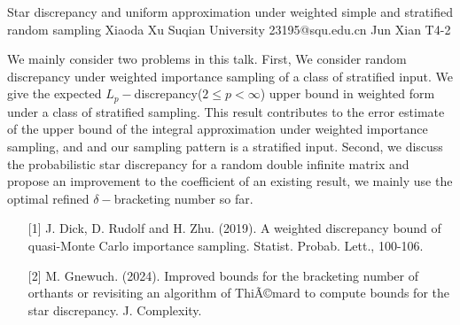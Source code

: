 \begin{talk}
  {Star discrepancy and uniform approximation under weighted simple and stratified random sampling}%
  {Xiaoda Xu}%
  {Suqian University}%
  {23195@squ.edu.cn}%
  {Jun Xian}%
  {T4-2}%
			
We mainly consider two problems in this talk. First, We consider random discrepancy under weighted importance sampling of a class of stratified input. We give the expected $L_p-$discrepancy($2\leq p<\infty$) upper bound in weighted form under a class of stratified sampling. This result contributes to the error estimate of the upper bound of the integral approximation under weighted importance sampling, and and our sampling pattern is a stratified input. Second, we discuss the probabilistic star discrepancy for a random double infinite matrix and propose an improvement to the coefficient of an existing result, we mainly use the optimal refined $\delta-$bracketing number so far.
\medskip


\begin{enumerate}
	\item[{[1]}] J. Dick, D. Rudolf and H. Zhu. (2019). A weighted discrepancy bound of quasi-Monte Carlo importance sampling. Statist. Probab. Lett., 100-106.
	\item[{[2]}] M. Gnewuch. (2024). Improved bounds for the bracketing number of orthants or revisiting an algorithm of ThiÃ©mard to compute bounds for the star discrepancy. J. Complexity.
\end{enumerate}


\end{talk}

